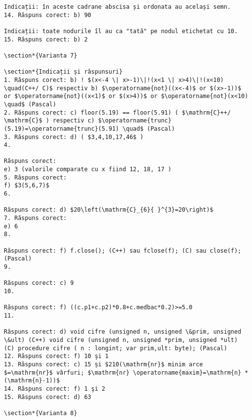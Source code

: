 \begin{verbatim}
Indicații: în aceste cadrane abscisa și ordonata au același semn.
14. Răspuns corect: b) 90

Indicații: toate nodurile îl au ca "tată" pe nodul etichetat cu 10.
15. Răspuns corect: b) 2

\section*{Varianta 7}

\section*{Indicații și răspunsuri}
1. Răspuns corect: b) ! $(x<-4 \| x>-1)\|!(x<1 \| x>4)\|!(x<10) \quad(C++/ C)$ respectiv b) $\operatorname{not}((x<-4)$ or $(x>-1))$ or $\operatorname{not}((x<1)$ or $(x>4))$ or $\operatorname{not}(x<10) \quad$ (Pascal)
2. Răspuns corect: c) floor(5.19) == floor(5.91) ( $\mathrm{C}++/ \mathrm{C}$ ) respectiv c) $\operatorname{trunc}(5.19)=\operatorname{trunc}(5.91) \quad$ (Pascal)
3. Răspuns corect: d) ( $3,4,10,17,46$ )
4.

Răspuns corect:
e) 3 (valorile comparate cu x fiind 12, 18, 17 )
5. Răspuns corect:
f) $3(5,6,7)$
6.

Răspuns corect: d) $20\left(\mathrm{C}_{6}{ }^{3}=20\right)$
7. Răspuns corect:
e) 6
8.

Răspuns corect: f) f.close(); (C++) sau fclose(f); (C) sau close(f); (Pascal)
9.

Răspuns corect: c) 9
10.

Răspuns corect: f) ((c.p1+c.p2)*0.8+c.medbac*0.2)>=5.0
11.

Răspuns corect: d) void cifre (unsigned n, unsigned \&prim, unsigned \&ult) (C++) void cifre (unsigned n, unsigned *prim, unsigned *ult) (C) procedure cifre ( n : longint; var prim,ult: byte); (Pascal)
12. Răspuns corect: f) 10 şi 1
13. Răspuns corect: c) 15 și $210(\mathrm{nr}$ minim arce $=\mathrm{nr}$ vârfuri; $\mathrm{nr} \operatorname{maxim}=\mathrm{n} *(\mathrm{n}-1))$
14. Răspuns corect: f) 1 şi 2
15. Răspuns corect: d) 63

\section*{Varianta 8}


\end{verbatim}
